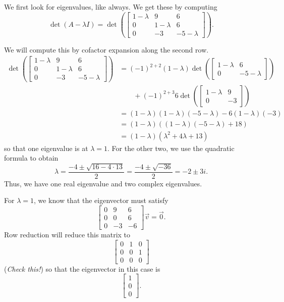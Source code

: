 \begin{exampleSol}
We first look for eigenvalues, like always. We get these by computing
\[ \det(A - \lambda I) = \det \left( \begin{bmatrix} 1-\lambda & 9 & 6 \\ 0 & 1-\lambda & 6 \\ 0 & -3 & -5-\lambda \end{bmatrix}\right).\]

We will compute this by cofactor expansion along the second row.
\[ \begin{split}
\det \left( \begin{bmatrix} 1-\lambda & 9 & 6 \\ 0 & 1-\lambda & 6 \\ 0 & -3 & -5-\lambda \end{bmatrix}\right) &= (-1)^{2+2}(1-\lambda)\det\left(\begin{bmatrix}1-\lambda & 6 \\ 0 & -5-\lambda \end{bmatrix}\right) \\ &\qquad + (-1)^{2+3} 6 \det\left( \begin{bmatrix} 1-\lambda & 9 \\ 0 & -3 \end{bmatrix}\right) \\
&= (1-\lambda)(1-\lambda)(-5-\lambda) - 6(1-\lambda)(-3) \\
&= (1-\lambda)((1-\lambda)(-5-\lambda) + 18) \\
&= (1-\lambda)(\lambda^2 + 4\lambda + 13)
\end{split} \]
so that one eigenvalue is at $\lambda = 1$. For the other two, we use the quadratic formula to obtain \[ \lambda = \frac{-4 \pm \sqrt{16 - 4\cdot 13}}{2} = \frac{-4 \pm \sqrt{-36}}{2} = -2 \pm 3i. \] Thus, we have one real eigenvalue and two complex eigenvalues. 

For $\lambda = 1$, we know that the eigenvector must satisfy
\[ \begin{bmatrix} 0 & 9 & 6 \\ 0 & 0 & 6 \\ 0 & -3 & -6 \end{bmatrix} \vec{v} = \vec{0}. \] Row reduction will reduce this matrix to
\[ \begin{bmatrix} 0 & 1 & 0 \\ 0 & 0 & 1 \\ 0 & 0 & 0 \end{bmatrix} \] (\emph{Check this!}) so that the eigenvector in this case is \[ \begin{bmatrix} 1 \\ 0 \\ 0 \end{bmatrix}.\]


\end{exampleSol}
